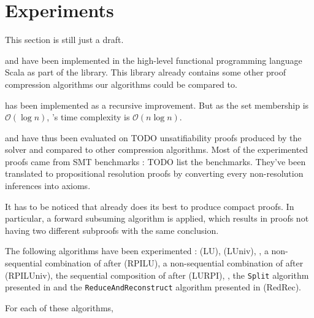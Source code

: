 \documentclass{llncs}
\begin{document}
\section{Experiments} \label{sec:exp}

\begin{jb}
This section is still just a draft.
\end{jb}

{\LowerUnivalents} and {\LUnivRPI} have been implemented in the high-level functional programming
language Scala as part of the \skeptik library. This library already contains some other proof
compression algorithms our algorithms could be compared to.

{\LowerUnivalents} has been implemented as a recursive  improvement. But as the set
membership is $\mathcal{O}(\log{n})$, {\LowerUnivalents}'s time complexity is $\mathcal{O}(n
\log{n})$.

{\LowerUnivalents} and {\LUnivRPI} have thus been evaluated on TODO
unsatifiability proofs produced by the \veriT solver and compared to other compression algorithms.
Most of the experimented proofs came from SMT benchmarks : TODO list the benchmarks. They've been
translated to propositional resolution proofs by converting every non-resolution inferences into
axioms.

It has to be noticed that \veriT already does its best to produce compact proofs. In particular,
a forward subsuming algorithm is applied, which results in proofs not having two different subproofs
with the same conclusion.

The following algorithms have been experimented : {\LowerUnits} (LU), {\LowerUnivalents} (LUniv),
{\RPI}, a non-sequential combination of {\RPI} after {\LowerUnits} (RPILU), a non-sequential
combination of {\RPI} after {\LowerUnivalents} (RPILUniv), the sequential composition of
{\LowerUnits} after {\RPI} (LURPI), {\LUnivRPI}, the \texttt{Split} algorithm presented in
\cite{CottonSplit} and the \texttt{ReduceAndReconstruct} algorithm presented in \cite{RedRec}
(RedRec).

For each of these algorithms, 
\end{document}
